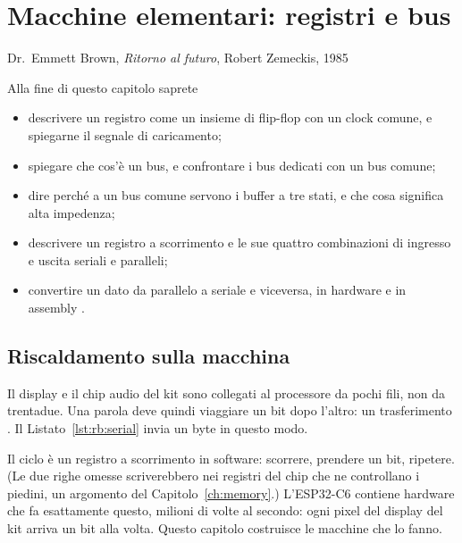 \chapter{Macchine elementari: registri e bus}
\label{ch:registers}

  {Dr.\ Emmett Brown, \emph{Ritorno al futuro}, Robert Zemeckis, 1985}

\begin{chapgoals}
Alla fine di questo capitolo saprete
\begin{itemize}
\item descrivere un registro come un insieme di flip-flop con un clock comune, e spiegarne il segnale di caricamento;
\item spiegare che cos'è un bus, e confrontare i bus dedicati con un bus comune;
\item dire perché a un bus comune servono i buffer a tre stati, e che cosa significa alta impedenza;
\item descrivere un registro a scorrimento e le sue quattro combinazioni di ingresso e uscita seriali e paralleli;
\item convertire un dato da parallelo a seriale e viceversa, in hardware e in assembly \riscv.
\end{itemize}
\end{chapgoals}


\section{Riscaldamento sulla macchina}

Il display e il chip audio del kit sono collegati al processore da pochi fili,
non da trentadue. Una parola deve quindi viaggiare un bit dopo l'altro: un
trasferimento . Il Listato~\ref{lst:rb:serial} invia un byte in
questo modo.


Il ciclo è un registro a scorrimento in software: scorrere, prendere un bit,
ripetere. (Le due righe omesse scriverebbero nei registri del chip che ne
controllano i piedini, un argomento del Capitolo~\ref{ch:memory}.) L'ESP32-C6
contiene hardware che fa esattamente questo, milioni di volte al secondo: ogni
pixel del display del kit arriva un bit alla volta. Questo capitolo costruisce
le macchine che lo fanno.

